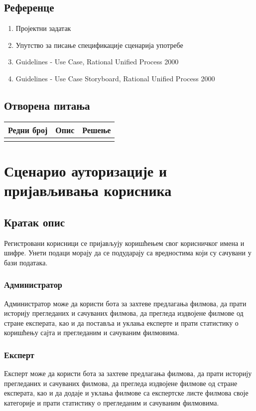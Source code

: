 \documentclass[12pt,a4paper]{article}
\begin{document}
\subsection{Референце}
 
\begin{enumerate}
  \item Пројектни задатак
  \item Упутство за писање спецификације сценарија употребе
  \item Guidelines - Use Case, Rational Unified Process 2000
  \item Guidelines - Use Case Storyboard, Rational Unified Process 2000
\end{enumerate}

\subsection{Отворена питања}

\noindent
\setcellgapes{4pt}
\makegapedcells
\begin{tabularx}{\linewidth}{|l|X|X|}
    \hline
    \textbf{Редни број} & \textbf{Опис} & \textbf{Решење} \\
    \hline
     &  &  \\
    \hline
\end{tabularx}
\section{Сценарио ауторизације и пријављивања корисника}
\subsection{Кратак опис}Регистровани корисници се пријављују коришћењем свог корисничког имена и шифре. Унети подаци морају да се
подударају са вредностима који су сачувани у бази података.

\subsubsection{Администратор}
 Администратор може да користи бота за захтеве предлагања филмова, да
прати историју прегледаних и сачуваних филмова, да прегледа издвојене филмове од стране експерата, као и да
поставља и уклања експерте и прати статистику о коришћењу сајта и прегледаним и сачуваним филмовима.
\subsubsection{Експерт}
Експерт може да користи бота за захтеве предлагања филмова, да
прати историју прегледаних и сачуваних филмова, да прегледа издвојене филмове од стране експерата, као и да
додаје и уклања филмове са експертске листе филмова своје категорије и прати статистику о прегледаним и
сачуваним филмовима.
\end{document}
